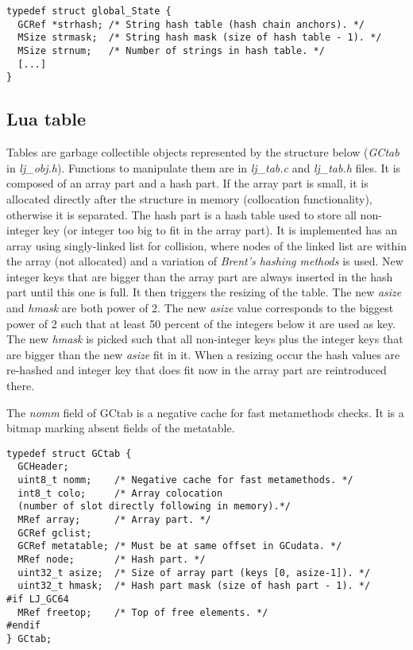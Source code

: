\begin{lstlisting}[style=CStyle]
typedef struct global_State {
  GCRef *strhash; /* String hash table (hash chain anchors). */
  MSize strmask;  /* String hash mask (size of hash table - 1). */
  MSize strnum;   /* Number of strings in hash table. */
  [...]
}
\end{lstlisting}


\subsection{Lua table}
\label{Subsec:table}

Tables are garbage collectible objects represented by the structure below
(\emph{GCtab} in \emph{lj\_obj.h}). Functions to manipulate them are in
\emph{lj\_tab.c} and \emph{lj\_tab.h} files. It is composed of an array part and
a hash part. If the array part is small, it is allocated directly after the
structure in memory (collocation functionality), otherwise it is separated. The
hash part is a hash table used to store all non-integer key (or integer too big
to fit in the array part). It is implemented has an array using singly-linked
list for collision, where nodes of the linked list are within the array (not
allocated) and a variation of \emph{Brent's hashing methods} is used.
New integer keys that are bigger than the array part are always inserted
in the hash part until this one is full. It then triggers the resizing of the
table. The new \emph{asize} and \emph{hmask} are both power of 2. The
new \emph{asize} value corresponds to the biggest power of 2 such that at least
50 percent of the integers below it are used as key. The new \emph{hmask} is
picked such that all non-integer keys plus the integer keys that are bigger than
the new \emph{asize} fit in it. When a resizing occur the hash values are
re-hashed and integer key that does fit now in the array part are reintroduced
there.

The \emph{nomm} field of GCtab is a
negative cache for fast metamethods checks. It is a bitmap marking absent fields
of the metatable.

\begin{lstlisting}[style=CStyle]
typedef struct GCtab {
  GCHeader;
  uint8_t nomm;    /* Negative cache for fast metamethods. */
  int8_t colo;     /* Array colocation
  (number of slot directly following in memory).*/
  MRef array;      /* Array part. */
  GCRef gclist;
  GCRef metatable; /* Must be at same offset in GCudata. */
  MRef node;       /* Hash part. */
  uint32_t asize;  /* Size of array part (keys [0, asize-1]). */
  uint32_t hmask;  /* Hash part mask (size of hash part - 1). */
#if LJ_GC64
  MRef freetop;    /* Top of free elements. */
#endif
} GCtab;
\end{lstlisting}


